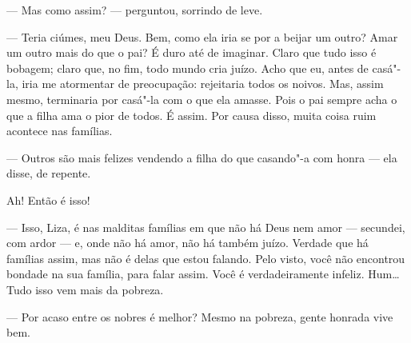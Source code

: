 --- Mas como assim? --- perguntou, sorrindo de leve.

--- Teria ciúmes, meu Deus. Bem, como ela iria se por a beijar um outro?
Amar um outro mais do que o pai? É duro até de imaginar. Claro que tudo
isso é bobagem; claro que, no fim, todo mundo cria juízo. Acho que eu,
antes de casá"-la, iria me atormentar de preocupação: rejeitaria todos os
noivos. Mas, assim mesmo, terminaria por casá"-la com o que ela amasse.
Pois o pai sempre acha o que a filha ama o pior de todos. É assim. Por
causa disso, muita coisa ruim acontece nas famílias.

--- Outros são mais felizes vendendo a filha do que casando"-a com honra ---
ela disse, de repente.

Ah! Então é isso!

--- Isso, Liza, é nas malditas famílias em que não há Deus nem amor ---
secundei, com ardor --- e, onde não há amor, não há também juízo. Verdade
que há famílias assim, mas não é delas que estou falando. Pelo visto,
você não encontrou bondade na sua família, para falar assim. Você é
verdadeiramente infeliz. Hum\ldots{} Tudo isso vem mais da pobreza.

--- Por acaso entre os nobres é melhor? Mesmo na pobreza, gente honrada
vive bem.


